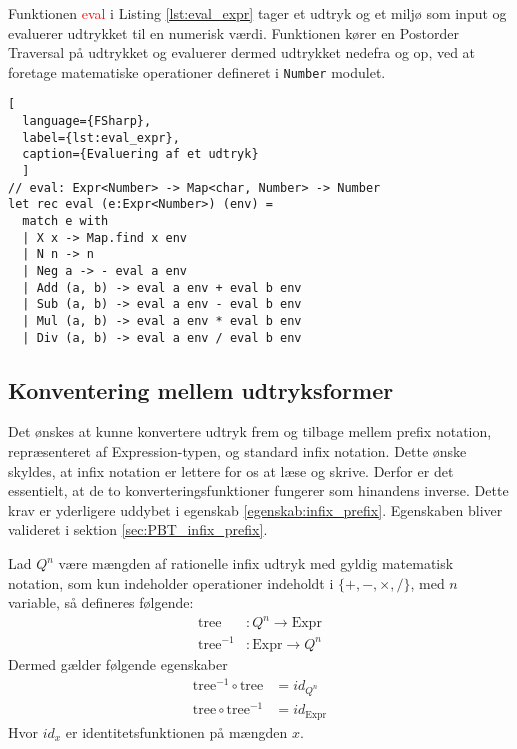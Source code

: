 Funktionen \textcolor{red}{eval} i Listing \ref{lst:eval_expr} tager et udtryk og et miljø som input og evaluerer udtrykket til en numerisk værdi. Funktionen kører en Postorder Traversal på udtrykket og evaluerer dermed udtrykket nedefra og op, ved at foretage matematiske operationer defineret i \texttt{Number} modulet. 

\begin{lstlisting}[
  language={FSharp}, 
  label={lst:eval_expr}, 
  caption={Evaluering af et udtryk}
  ]
// eval: Expr<Number> -> Map<char, Number> -> Number
let rec eval (e:Expr<Number>) (env) =
  match e with
  | X x -> Map.find x env
  | N n -> n
  | Neg a -> - eval a env
  | Add (a, b) -> eval a env + eval b env
  | Sub (a, b) -> eval a env - eval b env
  | Mul (a, b) -> eval a env * eval b env
  | Div (a, b) -> eval a env / eval b env
\end{lstlisting}

\subsection{Konventering mellem udtryksformer}\label{sec:expression_generation}
Det ønskes at kunne konvertere udtryk frem og tilbage mellem prefix notation, repræsenteret af Expression-typen, og standard infix notation. Dette ønske skyldes, at infix notation er lettere for os at læse og skrive. Derfor er det essentielt, at de to konverteringsfunktioner fungerer som hinandens inverse. Dette krav er yderligere uddybet i egenskab \ref{egenskab:infix_prefix}. Egenskaben bliver valideret i sektion \ref{sec:PBT_infix_prefix}.

\vspace{0.5cm}
\begin{egenskab}\label{egenskab:infix_prefix}
    Lad $Q^n$ være mængden af rationelle infix udtryk med gyldig matematisk notation, som kun indeholder operationer indeholdt i $\{+, -, \times, /\}$, med $n$ variable, så defineres følgende:
    \begin{align*}
      \text{tree}&: Q^n \to \text{Expr} \\
      \text{tree}^{-1}&: \text{Expr} \to  Q^n  
    \end{align*}
    Dermed gælder følgende egenskaber
    \begin{align*}
      \text{tree}^{-1} \circ \text{tree} &= id_{Q^n} \\
      \text{tree} \circ \text{tree}^{-1} &= id_{\text{Expr}}
    \end{align*}
    Hvor $id_{x}$ er identitetsfunktionen på mængden $x$.
\end{egenskab}

